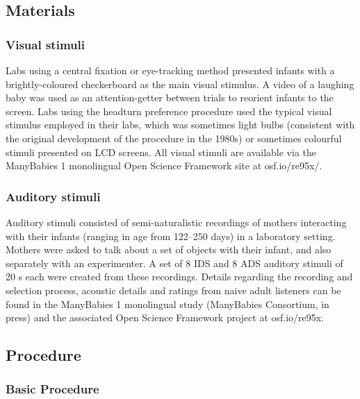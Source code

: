\documentclass[english,,man,floatsintext]{apa6}
\begin{document}
\hypertarget{materials}{%
\subsection{Materials}\label{materials}}

\hypertarget{visual-stimuli}{%
\subsubsection{Visual stimuli}\label{visual-stimuli}}

Labs using a central fixation or eye-tracking method presented infants with a brightly-coloured checkerboard as the main visual stimulus. A video of a laughing baby was used as an attention-getter between trials to reorient infants to the screen. Labs using the headturn preference procedure used the typical visual stimulus employed in their labs, which was sometimes light bulbs (consistent with the original development of the procedure in the 1980s) or sometimes colourful stimuli presented on LCD screens. All visual stimuli are available via the ManyBabies 1 monolingual Open Science Framework site at osf.io/re95x/.

\hypertarget{auditory-stimuli}{%
\subsubsection{Auditory stimuli}\label{auditory-stimuli}}

Auditory stimuli consisted of semi-naturalistic recordings of mothers interacting with their infants (ranging in age from 122--250 days) in a laboratory setting. Mothers were asked to talk about a set of objects with their infant, and also separately with an experimenter. A set of 8 IDS and 8 ADS auditory stimuli of 20 s each were created from these recordings. Details regarding the recording and selection process, acoustic details and ratings from naive adult listeners can be found in the ManyBabies 1 monolingual study (ManyBabies Consortium, in press) and the associated Open Science Framework project at osf.io/re95x.

\hypertarget{procedure}{%
\subsection{Procedure}\label{procedure}}

\hypertarget{basic-procedure}{%
\subsubsection{Basic Procedure}\label{basic-procedure}}
\end{document}
